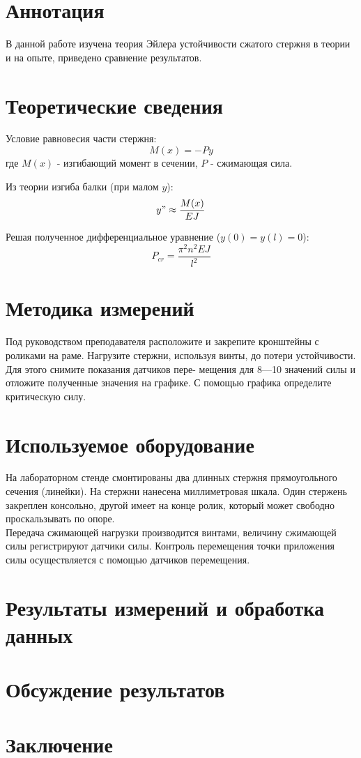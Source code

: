 \documentclass[a4paper,12pt]{article} %
\begin{document}

\newpage
\section{Аннотация}
В данной работе изучена теория Эйлера устойчивости сжатого стержня в теории и на опыте, приведено сравнение результатов.


\section{Теоретические сведения}
Условие равновесия части стержня:
\begin{equation}
    M(x) = -Py
\end{equation}
где $M(x)$ - изгибающий момент в сечении, $P$ - сжимающая сила.

Из теории изгиба балки (при малом $y$):
\begin{equation}
    y" \approx \frac{M(x)}{EJ}
\end{equation}

Решая полученное дифференциальное уравнение ($y(0)=y(l)=0$):
\begin{equation}
    P_{cr} = \frac{\pi^2 n^2  EJ}{l^2}
\end{equation}


\section{Методика измерений}
Под руководством преподавателя расположите и закрепите
кронштейны с роликами на раме. Нагрузите стержни, используя винты, до
потери устойчивости. Для этого снимите показания датчиков пере-
мещения для 8—10 значений силы и отложите полученные значения
на графике. С помощью графика определите критическую силу.


\section{Используемое оборудование}
На лабораторном стенде смонтированы два длинных стержня прямоугольного сечения (линейки). На стержни нанесена миллиметровая шкала. Один стержень закреплен консольно, другой имеет на конце ролик, который может свободно проскальзывать по опоре. \\
Передача сжимающей нагрузки производится винтами, величину сжимающей силы регистрируют датчики силы. Контроль перемещения точки приложения силы осуществляется с помощью датчиков перемещения.



\section{Результаты измерений и обработка данных}
\section{Обсуждение результатов}
\section{Заключение}
\end{document}
